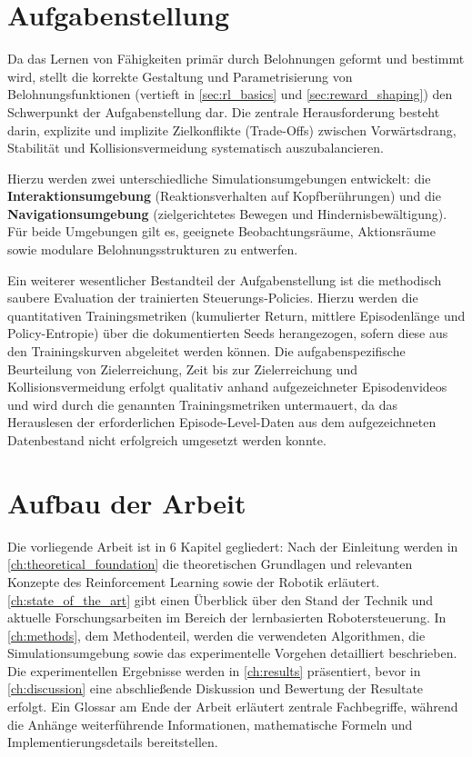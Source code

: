 \section{Aufgabenstellung}
Da das Lernen von Fähigkeiten primär durch Belohnungen geformt und bestimmt wird, stellt die korrekte Gestaltung und Parametrisierung von Belohnungsfunktionen (vertieft in \autoref{sec:rl_basics} und \autoref{sec:reward_shaping}) den Schwerpunkt der Aufgabenstellung dar. Die zentrale Herausforderung besteht darin, explizite und implizite Zielkonflikte (Trade-Offs) zwischen Vorwärtsdrang, Stabilität und Kollisionsvermeidung systematisch auszubalancieren.

Hierzu werden zwei unterschiedliche Simulationsumgebungen entwickelt: die \textbf{Interaktionsumgebung} (Reaktionsverhalten auf Kopfberührungen) und die \textbf{Navigationsumgebung} (zielgerichtetes Bewegen und Hindernisbewältigung). Für beide Umgebungen gilt es, geeignete Beobachtungsräume, Aktionsräume sowie modulare Belohnungsstrukturen zu entwerfen.

Ein weiterer wesentlicher Bestandteil der Aufgabenstellung ist die methodisch saubere Evaluation der trainierten Steuerungs-Policies. Hierzu werden die quantitativen Trainingsmetriken (kumulierter Return, mittlere Episodenlänge und Policy-Entropie) über die dokumentierten Seeds herangezogen, sofern diese aus den Trainingskurven abgeleitet werden können. Die aufgabenspezifische Beurteilung von Zielerreichung, Zeit bis zur Zielerreichung und Kollisionsvermeidung erfolgt qualitativ anhand aufgezeichneter Episodenvideos und wird durch die genannten Trainingsmetriken untermauert, da das Herauslesen der erforderlichen Episode-Level-Daten aus dem aufgezeichneten Datenbestand nicht erfolgreich umgesetzt werden konnte.

\section{Aufbau der Arbeit}
Die vorliegende Arbeit ist in 6 Kapitel gegliedert: Nach der Einleitung werden in \autoref{ch:theoretical_foundation} die theoretischen Grundlagen und relevanten Konzepte des Reinforcement Learning sowie der Robotik erläutert. \autoref{ch:state_of_the_art} gibt einen Überblick über den Stand der Technik und aktuelle Forschungsarbeiten im Bereich der lernbasierten Robotersteuerung. In \autoref{ch:methods}, dem Methodenteil, werden die verwendeten Algorithmen, die Simulationsumgebung sowie das experimentelle Vorgehen detailliert beschrieben. Die experimentellen Ergebnisse werden in \autoref{ch:results} präsentiert, bevor in \autoref{ch:discussion} eine abschließende Diskussion und Bewertung der Resultate erfolgt. Ein Glossar am Ende der Arbeit erläutert zentrale Fachbegriffe, während die Anhänge weiterführende Informationen, mathematische Formeln und Implementierungsdetails bereitstellen.

